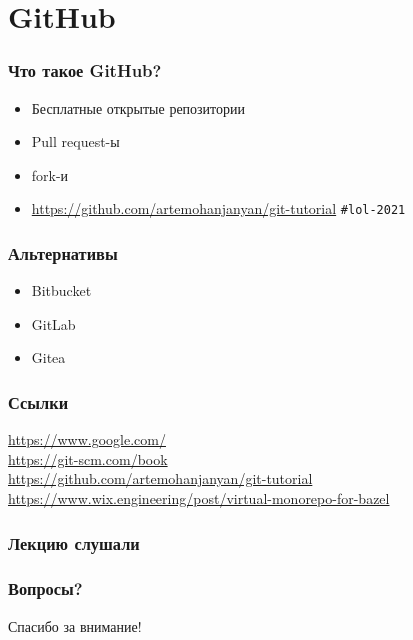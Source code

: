 \documentclass[pdf,russian,aspectratio=169]{beamer}
\begin{document}
\section{GitHub}

\begin{frame}
    \frametitle{Что такое GitHub?}
    \begin{itemize}
        \pause
        \item Бесплатные открытые репозитории
        \pause
        \item Pull request-ы
        \pause
        \item fork-и
        \pause
        \item \url{https://github.com/artemohanjanyan/git-tutorial}
            \pause\texttt{\#{}lol-2021}
    \end{itemize}
\end{frame}

\begin{frame}
    \frametitle{Альтернативы}
    \begin{itemize}
        \pause
        \item Bitbucket
        \pause
        \item GitLab
        \pause
        \item Gitea
    \end{itemize}
\end{frame}

\begin{frame}
    \frametitle{Ссылки}
    \url{https://www.google.com/}\\
    \url{https://git-scm.com/book}\\
    \url{https://github.com/artemohanjanyan/git-tutorial}\\
    \url{https://www.wix.engineering/post/virtual-monorepo-for-bazel}
\end{frame}

\begin{frame}
    \frametitle{Лекцию слушали}
    
\end{frame}

\begin{frame}
    \frametitle{Вопросы?}
    \pause
    Спасибо за внимание!
\end{frame}
\end{document}
